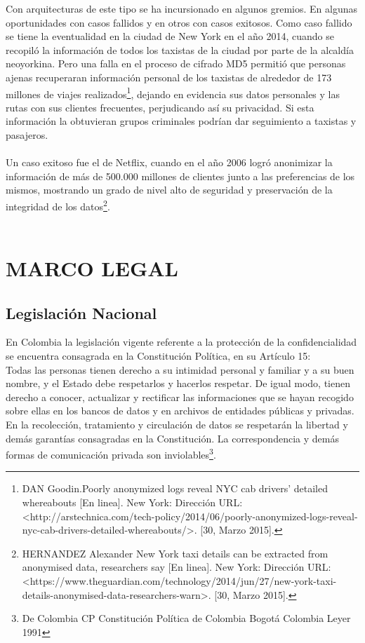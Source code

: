 \documentclass[a4paper,openright,12pt]{book}
\theoremstyle{definition}
\theoremstyle{remark}
\begin{document}
Con arquitecturas de  este  tipo se ha incursionado  en  algunos gremios. En algunas oportunidades con casos fallidos  y en otros con casos exitosos. Como caso fallido se tiene  la eventualidad en la  ciudad de New York en el año 2014, cuando se recopiló la información de todos los taxistas de la ciudad por parte de la alcaldía neoyorkina. Pero una falla en el proceso de cifrado MD5 permitió que personas ajenas recuperaran información personal de los taxistas de alrededor de 173 millones de viajes realizados\footnote{DAN Goodin.Poorly anonymized logs reveal NYC cab drivers’ detailed whereabouts [En linea]. New York: Dirección URL: <http://arstechnica.com/tech-policy/2014/06/poorly-anonymized-logs-reveal-nyc-cab-drivers-detailed-whereabouts/>. [30, Marzo 2015].}, dejando en evidencia sus datos personales y las rutas con sus clientes frecuentes,  perjudicando así su privacidad. Si esta información la obtuvieran grupos criminales podrían dar seguimiento a taxistas y pasajeros.\\\\
Un caso exitoso fue el de Netflix, cuando en el año 2006 logró anonimizar la información de más de 500.000 millones de clientes junto a las preferencias de los mismos, mostrando un grado de nivel alto de seguridad y preservación de la integridad de los datos\footnote{HERNANDEZ Alexander New York taxi details can be extracted from anonymised data, researchers say [En linea]. New York: Dirección URL: <https://www.theguardian.com/technology/2014/jun/27/new-york-taxi-details-anonymised-data-researchers-warn>. [30, Marzo 2015].}.\\\\

\section{MARCO LEGAL}

\subsection{Legislación Nacional}

En Colombia la legislación vigente referente a la protección de la confidencialidad se encuentra consagrada en la Constitución Política, en su Artículo 15:\\
Todas las personas tienen derecho a su intimidad personal y familiar y a su buen nombre, y el Estado debe respetarlos y hacerlos respetar. De igual modo, tienen derecho a conocer, actualizar y rectificar las informaciones que se hayan recogido sobre ellas en los bancos de datos y en archivos de entidades públicas y privadas. En la recolección, tratamiento y circulación de datos se respetarán la libertad y demás garantías consagradas en la Constitución. La correspondencia y demás formas de comunicación privada son inviolables\footnote{De Colombia CP Constitución Política de Colombia Bogotá Colombia Leyer 1991}.
\end{document}
